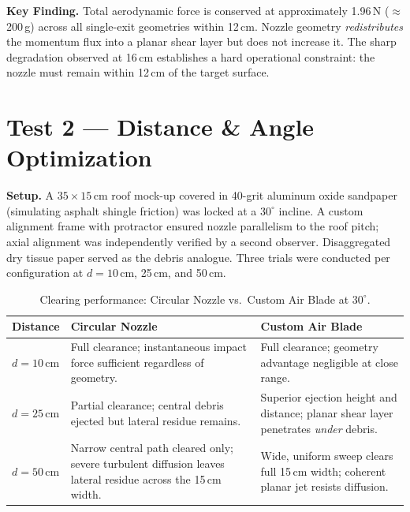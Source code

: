 \documentclass[12pt]{article}
\begin{document}
\textbf{Key Finding.} Total aerodynamic force is conserved at approximately 1.96\,N ($\approx$200\,g) across all single-exit geometries within 12\,cm. Nozzle geometry \emph{redistributes} the momentum flux into a planar shear layer but does not increase it. The sharp degradation observed at 16\,cm establishes a hard operational constraint: the nozzle must remain within 12\,cm of the target surface.

\section{Test 2 --- Distance \& Angle Optimization}

\textbf{Setup.} A $35 \times 15$\,cm roof mock-up covered in 40-grit aluminum oxide sandpaper (simulating asphalt shingle friction) was locked at a $30^\circ$ incline. A custom alignment frame with protractor ensured nozzle parallelism to the roof pitch; axial alignment was independently verified by a second observer. Disaggregated dry tissue paper served as the debris analogue. Three trials were conducted per configuration at $d = 10$\,cm, 25\,cm, and 50\,cm.

\begin{table}[H]
\centering
\caption{Clearing performance: Circular Nozzle vs.\ Custom Air Blade at $30^\circ$.}
\label{tab:test2}
\begin{tabularx}{\textwidth}{@{}lXX@{}}
\toprule
\textbf{Distance} & \textbf{Circular Nozzle} & \textbf{Custom Air Blade} \\
\midrule
$d = 10$\,cm &
Full clearance; instantaneous impact force sufficient regardless of geometry. &
Full clearance; geometry advantage negligible at close range. \\
\addlinespace
$d = 25$\,cm &
Partial clearance; central debris ejected but lateral residue remains. &
Superior ejection height and distance; planar shear layer penetrates \emph{under} debris. \\
\addlinespace
$d = 50$\,cm &
Narrow central path cleared only; severe turbulent diffusion leaves lateral residue across the 15\,cm width. &
Wide, uniform sweep clears full 15\,cm width; coherent planar jet resists diffusion. \\
\bottomrule
\end{tabularx}
\end{table}
\end{document}
